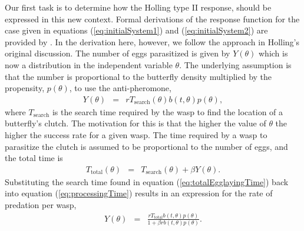 \documentclass[review,authoryear]{elsarticle}
\newcommand{\origB}{{b}}
\newcommand{\origP}[1]{{p}(#1)}
\newcommand{\origTheta}{{\theta}}
\newcommand{\origT}{{t}}
\begin{document}
Our first task is to determine how the Holling type II response,
should be expressed in this new context. Formal derivations of the
response function for the case given in equations
(\ref{eq:initialSystem1}) and (\ref{eq:initialSystem2}) are provided
by \cite{DAWES201311}.  In the derivation here,
however, we follow the approach in Holling's original
discussion\citep{holling_1959A,holling_1959B}. The number of eggs parasitized is given by $Y(\origTheta)$ which is now a distribution in the independent variable $\theta$.  The underlying assumption is that the number is proportional to the butterfly density multiplied by the propensity, $\origP{\origTheta}$, to use the anti-pheromone,
\begin{eqnarray}
  \label{eq:processingTime}
  Y(\origTheta) & = & r T_{\mathrm{search}}(\origTheta) \origB(\origT,\origTheta) \origP{\origTheta},
\end{eqnarray}
where $T_{\mathrm{search}}$ is the search time required by the wasp to
find the location of a butterfly's clutch. The motivation for this is
that the higher the value of $\origTheta$ the higher the success rate for
a given wasp.  The time required by a wasp to parasitize the clutch is
assumed to be proportional to the number of eggs, and the total time
is
\begin{eqnarray}
  \label{eq:totalEgglayingTime}
  T_{\mathrm{total}}(\origTheta) & = & T_{\mathrm{search}}(\origTheta) + \beta Y(\origTheta).
\end{eqnarray}
Substituting the search time found in equation
(\ref{eq:totalEgglayingTime}) back into equation
(\ref{eq:processingTime}) results in an expression for the rate of
predation per wasp,
\begin{eqnarray}
  \label{eq:waspPredationRate}
  Y(\origTheta) & = & \frac{r T_{\mathrm{total}} \origB(\origT,\origTheta) \origP{\origTheta}}{1 + \beta r \origB(\origT,\origTheta) \origP{\origTheta}}.
\end{eqnarray}
\end{document}

